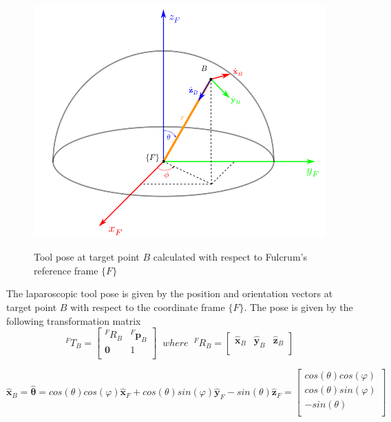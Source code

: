 \begin{center}
\begin{figure}[!htb]
\centering
\includegraphics[width=12cm]{images/fulcrum-space.png}\\
\caption{Tool pose at target point $B$ calculated with respect to Fulcrum's reference frame $\lbrace F \rbrace$}
\end{figure}
\end{center}

The laparoscopic tool pose is given by the position and orientation vectors at target point $B$ with respect to the coordinate frame $\lbrace F \rbrace$.
The pose is given by the following transformation matrix
\[
{}^{F}T_B = \begin{bmatrix}
{}^{F}R_B & {}^{F}\mathbf{p}^{}_B \\
\mathbf{0} & 1 \\
\end{bmatrix}
\;\; where \;\;
{}^{F}R_B = \begin{bmatrix}
\hat{\mathbf{x}}^{}_B & \hat{\mathbf{y}}^{}_B & \hat{\mathbf{z}}^{}_B \\
\end{bmatrix}
\]

\begin{equation}
\hat{\mathbf{x}}^{}_B = \hat{\mathbf{θ}} = cos(θ)cos(φ)\hat{\mathbf{x}}^{}_F + cos(θ)sin(φ)\hat{\mathbf{y}}^{}_F - sin(θ)\hat{\mathbf{z}}^{}_F
= \begin{bmatrix}
cos(θ)cos(φ) \\
cos(θ)sin(φ) \\
- sin(θ) \\
\end{bmatrix}
\end{equation}

